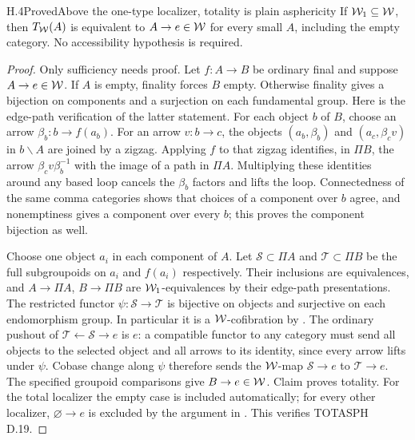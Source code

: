 \begin{claim}{H.4}{Proved}{Above the one-type localizer, totality is plain asphericity}
If $\mathcal{W}_1\subseteq\mathcal{W}$, then $T_{\mathcal{W}}(A)$ is equivalent to $A\to e\in\mathcal{W}$ for every small $A$, including the empty category. No accessibility hypothesis is required.
\end{claim}
\begin{proof}
Only sufficiency needs proof. Let $f:A\to B$ be ordinary final and suppose $A\to e\in\mathcal{W}$. If $A$ is empty, finality forces $B$ empty. Otherwise finality gives a bijection on components and a surjection on each fundamental group. Here is the edge-path verification of the latter statement. For each object $b$ of $B$, choose an arrow $\beta_b:b\to f(a_b)$. For an arrow $v:b\to c$, the objects $(a_b,\beta_b)$ and $(a_c,\beta_cv)$ in $b\backslash A$ are joined by a zigzag. Applying $f$ to that zigzag identifies, in $\Pi B$, the arrow $\beta_cv\beta_b^{-1}$ with the image of a path in $\Pi A$. Multiplying these identities around any based loop cancels the $\beta_b$ factors and lifts the loop. Connectedness of the same comma categories shows that choices of a component over $b$ agree, and nonemptiness gives a component over every $b$; this proves the component bijection as well.

Choose one object $a_i$ in each component of $A$. Let $\mathcal S\subset\Pi A$ and $\mathcal T\subset\Pi B$ be the full subgroupoids on $a_i$ and $f(a_i)$ respectively. Their inclusions are equivalences, and $A\to\Pi A$, $B\to\Pi B$ are $\mathcal{W}_1$-equivalences by their edge-path presentations. The restricted functor $\psi:\mathcal S\to\mathcal T$ is bijective on objects and surjective on each endomorphism group. In particular it is a $\mathcal{W}$-cofibration by . The ordinary pushout of $\mathcal T\leftarrow\mathcal S\to e$ is $e$: a compatible functor to any category must send all objects to the selected object and all arrows to its identity, since every arrow lifts under $\psi$. Cobase change along $\psi$ therefore sends the $\mathcal{W}$-map $\mathcal S\to e$ to $\mathcal T\to e$. The specified groupoid comparisons give $B\to e\in\mathcal{W}$. Claim  proves totality. For the total localizer the empty case is included automatically; for every other localizer, $\varnothing\to e$ is excluded by the argument in . This verifies TOTASPH D.19.
\end{proof}

